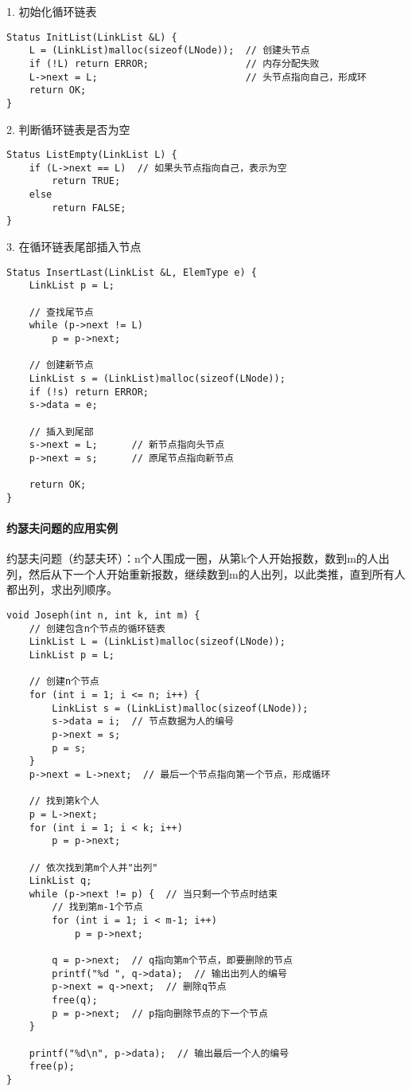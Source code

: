 \documentclass{../../note}
\begin{document}
1. 初始化循环链表
\begin{verbatim}
Status InitList(LinkList &L) {
    L = (LinkList)malloc(sizeof(LNode));  // 创建头节点
    if (!L) return ERROR;                 // 内存分配失败
    L->next = L;                          // 头节点指向自己，形成环
    return OK;
}
\end{verbatim}

2. 判断循环链表是否为空
\begin{verbatim}
Status ListEmpty(LinkList L) {
    if (L->next == L)  // 如果头节点指向自己，表示为空
        return TRUE;
    else
        return FALSE;
}
\end{verbatim}

3. 在循环链表尾部插入节点
\begin{verbatim}
Status InsertLast(LinkList &L, ElemType e) {
    LinkList p = L;

    // 查找尾节点
    while (p->next != L)
        p = p->next;

    // 创建新节点
    LinkList s = (LinkList)malloc(sizeof(LNode));
    if (!s) return ERROR;
    s->data = e;

    // 插入到尾部
    s->next = L;      // 新节点指向头节点
    p->next = s;      // 原尾节点指向新节点

    return OK;
}
\end{verbatim}

\paragraph{约瑟夫问题的应用实例}
约瑟夫问题（约瑟夫环）：n个人围成一圈，从第k个人开始报数，数到m的人出列，然后从下一个人开始重新报数，继续数到m的人出列，以此类推，直到所有人都出列，求出列顺序。

\begin{verbatim}
void Joseph(int n, int k, int m) {
    // 创建包含n个节点的循环链表
    LinkList L = (LinkList)malloc(sizeof(LNode));
    LinkList p = L;

    // 创建n个节点
    for (int i = 1; i <= n; i++) {
        LinkList s = (LinkList)malloc(sizeof(LNode));
        s->data = i;  // 节点数据为人的编号
        p->next = s;
        p = s;
    }
    p->next = L->next;  // 最后一个节点指向第一个节点，形成循环

    // 找到第k个人
    p = L->next;
    for (int i = 1; i < k; i++)
        p = p->next;

    // 依次找到第m个人并"出列"
    LinkList q;
    while (p->next != p) {  // 当只剩一个节点时结束
        // 找到第m-1个节点
        for (int i = 1; i < m-1; i++)
            p = p->next;

        q = p->next;  // q指向第m个节点，即要删除的节点
        printf("%d ", q->data);  // 输出出列人的编号
        p->next = q->next;  // 删除q节点
        free(q);
        p = p->next;  // p指向删除节点的下一个节点
    }

    printf("%d\n", p->data);  // 输出最后一个人的编号
    free(p);
}
\end{verbatim}
\end{document}
